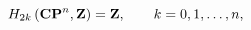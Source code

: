 \begin{equation}
H_{2k}\left({\bf CP}^n, {\bf Z}\right)={\bf Z}, \qquad 
k=0,1,\ldots, n,
\label{oncero}
\end{equation}

